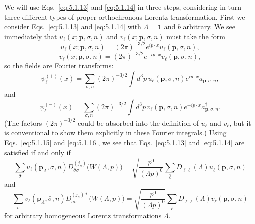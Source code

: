 We will use Eqs.~\eqref{eq:5.1.13} and \eqref{eq:5.1.14} in three steps, considering in turn
three different types of proper orthochronous Lorentz transformation.
First we consider Eqs.~\eqref{eq:5.1.13} and \eqref{eq:5.1.14} with $\Lambda=\mathbf{1}$ and
$b$ arbitrary. We see immediately that $u_\ell(x;\mathbf{p},\sigma,n)$ and
$v_\ell(x;\mathbf{p},\sigma,n)$ must take the form
\begin{equation}
  u_\ell(x;\mathbf{p},\sigma,n)=(2\pi)^{-3/2}e^{ip\cdot x}
  u_\ell(\mathbf{p},\sigma,n),
  \tag{5.1.15}\label{eq:5.1.15}
\end{equation}
\begin{equation}
  v_\ell(x;\mathbf{p},\sigma,n)=(2\pi)^{-3/2}e^{-ip\cdot x}
  v_\ell(\mathbf{p},\sigma,n),
  \tag{5.1.16}\label{eq:5.1.16}
\end{equation}
so the fields are Fourier transforms:
\begin{equation}
  \psi^{(+)}_\ell(x)=\sum_{\sigma,n}(2\pi)^{-3/2}\int d^3p\,
  u_\ell(\mathbf{p},\sigma,n)e^{ip\cdot x}a_{\mathbf{p},\sigma,n},
  \tag{5.1.17}\label{eq:5.1.17}
\end{equation}
and
\begin{equation}
  \psi^{(-)}_\ell(x)=\sum_{\sigma,n}(2\pi)^{-3/2}\int d^3p\,
  v_\ell(\mathbf{p},\sigma,n)e^{-ip\cdot x}a^\dagger_{\mathbf{p},\sigma,n}.
  \tag{5.1.18}\label{eq:5.1.18}
\end{equation}
(The factors $(2\pi)^{-3/2}$ could be absorbed into the definition of
$u_\ell$ and $v_\ell$, but it is conventional to show them explicitly in
these Fourier integrals.) Using Eqs.~\eqref{eq:5.1.15} and \eqref{eq:5.1.16}, we see that
Eqs.~\eqref{eq:5.1.13} and \eqref{eq:5.1.14} are satisfied if and only if
\begin{equation}
  \sum_{\bar\sigma}u_\ell(\mathbf{p}_\Lambda,\bar\sigma,n)
  D^{(j_n)}_{\bar\sigma\sigma}\bigl(W(\Lambda,p)\bigr)
  =\sqrt{\frac{p^0}{(\Lambda p)^0}}
  \sum_{\bar\ell}D_{\ell\bar\ell}(\Lambda)
  u_{\bar\ell}(\mathbf{p},\sigma,n)
  \tag{5.1.19}\label{eq:5.1.19}
\end{equation}
and
\begin{equation}
  \sum_{\bar\sigma}v_\ell(\mathbf{p}_\Lambda,\bar\sigma,n)
  D^{(j_n)*}_{\bar\sigma\sigma}\bigl(W(\Lambda,p)\bigr)
  =\sqrt{\frac{p^0}{(\Lambda p)^0}}
  \sum_{\bar\ell}D_{\ell\bar\ell}(\Lambda)
  v_{\bar\ell}(\mathbf{p},\sigma,n)
  \tag{5.1.20}\label{eq:5.1.20}
\end{equation}
for arbitrary homogeneous Lorentz transformations $\Lambda$.

